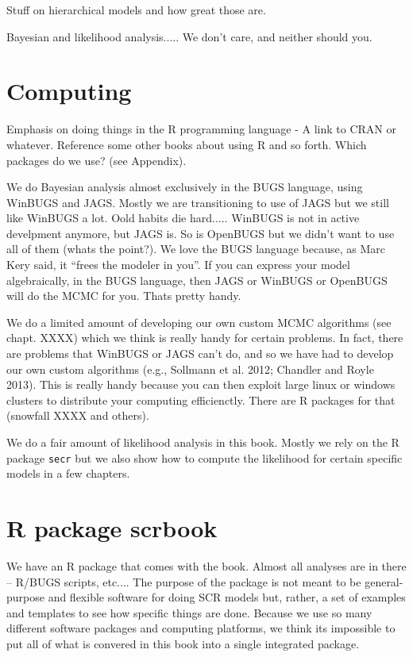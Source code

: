 Stuff on hierarchical models and how great those are.

Bayesian and likelihood analysis..... We don't care, and neither
should you.

\section{Computing}

Emphasis on doing things in the 
R programming language  - A link to CRAN or whatever. Reference some
other books about using R and so forth. Which packages do we use? (see
Appendix). 

We do Bayesian analysis almost exclusively in the BUGS language, using
WinBUGS and JAGS. Mostly we are transitioning to use of JAGS but we
still like WinBUGS a lot. Oold habits die hard..... WinBUGS is not in
active develpment anymore, but JAGS is. So is OpenBUGS but we didn't
want to use all of them (whats the point?). We love the BUGS language
because, as Marc Kery said, it ``frees the modeler in you''.
If you can express your model algebraically, in the BUGS language,
then JAGS or WinBUGS or OpenBUGS will do the MCMC for you. Thats
pretty handy.

We do a limited amount of developing our own custom MCMC algorithms
(see chapt. XXXX) which we think is really handy for certain
problems. In fact, there are problems that WinBUGS or JAGS can't do,
and so we have had to develop our own custom algorithms (e.g.,
Sollmann et al. 2012; Chandler and Royle 2013). This is really handy
because you can then exploit large linux or windows clusters to
distribute your computing efficienctly. There are R packages for that
(snowfall XXXX and others). 

We do a fair amount of likelihood analysis in this book. Mostly we
rely on the R package \mbox{\tt secr} \citep{efford_etal:2009euring}
but we also show how to compute the likelihood for certain specific
models in a few chapters.

\section{R package scrbook}

We have an R package that comes with the book. Almost all analyses are
in there -- R/BUGS scripts, etc....
The purpose of the package is  not meant to be general-purpose and
flexible software for doing SCR models but, rather, a set of examples
and templates to see how specific things are done.   Because we use so
many different software packages and computing platforms, we think its
impossible to put all of what is convered in this book into a single
integrated package. 


